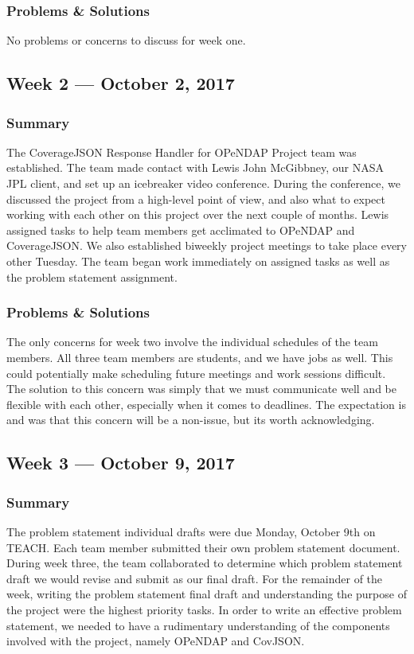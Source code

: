 \documentclass[onecolumn, draftclsnofoot,10pt, compsoc]{IEEEtran}
\begin{document}
\subsubsection{Problems \& Solutions}
No problems or concerns to discuss for week one.

\subsection{Week 2 --- October 2, 2017}
\subsubsection{Summary}
The CoverageJSON Response Handler for OPeNDAP Project team was  established. The team made contact with Lewis John McGibbney, our NASA JPL client, and set up an icebreaker video conference. During the conference, we discussed the project from a high-level point of view, and also what to expect working with each other on this project over the next couple of months. Lewis assigned tasks to help team members get acclimated to OPeNDAP and CoverageJSON. We also established biweekly project meetings to take place every other Tuesday. The team began work immediately on assigned tasks as well as the problem statement assignment.
\subsubsection{Problems \& Solutions}
The only concerns for week two involve the individual schedules of the team members. All three team members are students, and we have jobs as well. This could potentially make scheduling future meetings and work sessions difficult. The solution to this concern was simply that we must communicate well and be flexible with each other, especially when it comes to deadlines. The expectation is and was that this concern will be a non-issue, but its worth acknowledging.

\subsection{Week 3 --- October 9, 2017}
\subsubsection{Summary}
The problem statement individual drafts were due Monday, October 9th on TEACH. Each team member submitted their own problem statement document. During week three, the team collaborated to determine which problem statement draft we would revise and submit as our final draft. For the remainder of the week, writing the problem statement final draft and understanding the purpose of the project were the highest priority tasks. In order to write an effective problem statement, we needed to have a rudimentary understanding of the components involved with the project, namely OPeNDAP and CovJSON.
\end{document}
